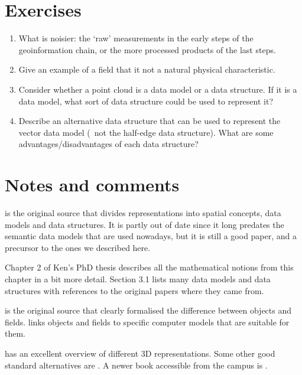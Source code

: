 %
\section{Exercises}

\begin{enumerate}
	\item What is noisier: the `raw' measurements in the early steps of the geoinformation chain, or the more processed products of the last steps.
	\item Give an example of a field that it not a natural physical characteristic.
	\item Consider whether a point cloud is a data model or a data structure. If it is a data model, what sort of data structure could be used to represent it?
	\item Describe an alternative data structure that can be used to represent the vector data model (\ie\ not the half-edge data structure). What are some advantages/disadvantages of each data structure?
\end{enumerate}



%
\section{Notes and comments}

\citet{Frank92} is the original source that divides representations into spatial concepts, data models and data structures.
It is partly out of date since it long predates the semantic data models that are used nowadays, but it is still a good paper, and a precursor to the ones we described here.

Chapter 2 of Ken's PhD thesis describes all the mathematical notions from this chapter in a bit more detail.
Section 3.1 lists many data models and data structures with references to the original papers where they came from.

\citet{Couclelis92} is the original source that clearly formalised the difference between objects and fields.
\citet{Goodchild92} links objects and fields to specific computer models that are suitable for them.

\citet{Mantyla88} has an excellent overview of different 3D representations.
Some other good standard alternatives are \citet{Requicha80,Hoffmann92,Foley95}.
A newer book accessible from the campus is \citet{Salomon11}.

